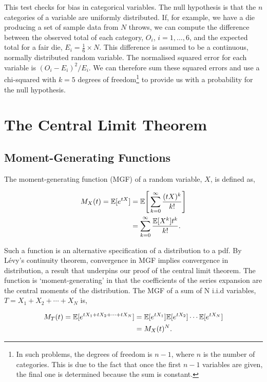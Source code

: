 \documentclass[11pt]{amsart}
\begin{document}
This test checks for bias in categorical variables. The null hypothesis is that the $n$ categories of a variable are uniformly distributed. If, for example, we have a die producing a set of sample data from $N$ throws, we can compute the difference between the observed total of each category, $O_i$, $i = 1, \dots, 6$, and the expected total for a fair die, $E_i = \frac{1}{6}\times N$. This difference is assumed to be a continuous, normally distributed random variable. The normalised squared error for each variable is $(O_i - E_i)^2/E_i$. We can therefore sum these squared errors and use a chi-squared with $k = 5$ degrees of freedom\footnote{In such problems, the degrees of freedom is $n - 1$, where $n$ is the number of categories. This is due to the fact that once the first $n-1$ variables are given, the final one is determined because the sum is constant.} to provide us with a probability for the null hypothesis.

\section{The Central Limit Theorem}
\subsection{Moment-Generating Functions}

The moment-generating function (MGF) of a random variable, $X$, is defined as,

\begin{align}
M_X(t) = \mathbb{E}[e^{tX}] &= \mathbb{E}\Bigg[\sum_{k = 0}^{\infty} \frac{(tX)^k}{k!}\Bigg] \notag \\
&= \sum_{k = 0}^{\infty} \frac{\mathbb{E}[X^k]t^k}{k!}. \notag
\end{align}

Such a function is an alternative specification of a distribution to a pdf. By L\'evy's continuity theorem, convergence in MGF implies convergence in distribution, a result that underpins our proof of the central limit theorem. The function is `moment-generating' in that the coefficients of the series expansion are the central moments of the distribution. The MGF of a sum of N i.i.d variables, $T = X_1 + X_2 + \cdots + X_N$ is,

\begin{align}
M_T(t) = \mathbb{E}[e^{tX_1 + tX_2 + \cdots + tX_N}] &= \mathbb{E}[e^{tX_1}]\mathbb{E} [e^{tX_2}] \cdots\mathbb{E}[e^{tX_N}] \notag \\
&= M_X(t)^N. \notag
\end{align}
\end{document}
